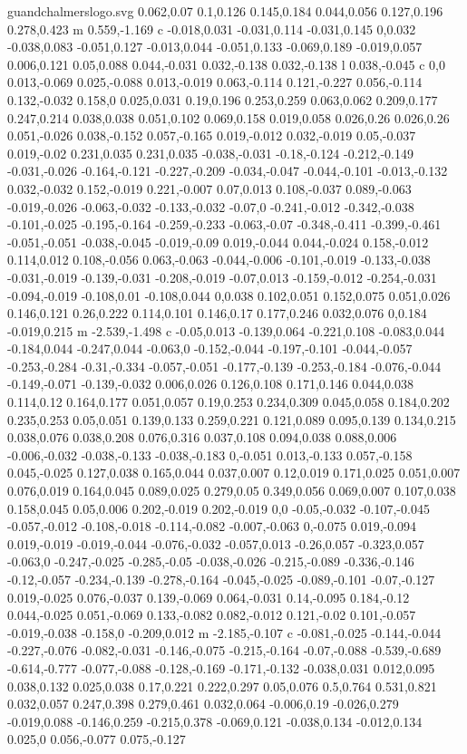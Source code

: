 \begin{filecontents}[noheader]{guandchalmerslogo.svg}
0.062,0.07 0.1,0.126 0.145,0.184 0.044,0.056 0.127,0.196 0.278,0.423 m 0.559,-1.169 c -0.018,0.031 -0.031,0.114 -0.031,0.145 0,0.032 -0.038,0.083 -0.051,0.127 -0.013,0.044 -0.051,0.133 -0.069,0.189 -0.019,0.057 0.006,0.121 0.05,0.088 0.044,-0.031 0.032,-0.138 0.032,-0.138 l 0.038,-0.045 c 0,0 0.013,-0.069 0.025,-0.088 0.013,-0.019 0.063,-0.114 0.121,-0.227 0.056,-0.114 0.132,-0.032 0.158,0 0.025,0.031 0.19,0.196 0.253,0.259 0.063,0.062 0.209,0.177 0.247,0.214 0.038,0.038 0.051,0.102 0.069,0.158 0.019,0.058 0.026,0.26 0.026,0.26 0.051,-0.026 0.038,-0.152 0.057,-0.165 0.019,-0.012 0.032,-0.019 0.05,-0.037 0.019,-0.02 0.231,0.035 0.231,0.035 -0.038,-0.031 -0.18,-0.124 -0.212,-0.149 -0.031,-0.026 -0.164,-0.121 -0.227,-0.209 -0.034,-0.047 -0.044,-0.101 -0.013,-0.132 0.032,-0.032 0.152,-0.019 0.221,-0.007 0.07,0.013 0.108,-0.037 0.089,-0.063 -0.019,-0.026 -0.063,-0.032 -0.133,-0.032 -0.07,0 -0.241,-0.012 -0.342,-0.038 -0.101,-0.025 -0.195,-0.164 -0.259,-0.233 -0.063,-0.07 -0.348,-0.411 -0.399,-0.461 -0.051,-0.051 -0.038,-0.045 -0.019,-0.09 0.019,-0.044 0.044,-0.024 0.158,-0.012 0.114,0.012 0.108,-0.056 0.063,-0.063 -0.044,-0.006 -0.101,-0.019 -0.133,-0.038 -0.031,-0.019 -0.139,-0.031 -0.208,-0.019 -0.07,0.013 -0.159,-0.012 -0.254,-0.031 -0.094,-0.019 -0.108,0.01 -0.108,0.044 0,0.038 0.102,0.051 0.152,0.075 0.051,0.026 0.146,0.121 0.26,0.222 0.114,0.101 0.146,0.17 0.177,0.246 0.032,0.076 0,0.184 -0.019,0.215 m -2.539,-1.498 c -0.05,0.013 -0.139,0.064 -0.221,0.108 -0.083,0.044 -0.184,0.044 -0.247,0.044 -0.063,0 -0.152,-0.044 -0.197,-0.101 -0.044,-0.057 -0.253,-0.284 -0.31,-0.334 -0.057,-0.051 -0.177,-0.139 -0.253,-0.184 -0.076,-0.044 -0.149,-0.071 -0.139,-0.032 0.006,0.026 0.126,0.108 0.171,0.146 0.044,0.038 0.114,0.12 0.164,0.177 0.051,0.057 0.19,0.253 0.234,0.309 0.045,0.058 0.184,0.202 0.235,0.253 0.05,0.051 0.139,0.133 0.259,0.221 0.121,0.089 0.095,0.139 0.134,0.215 0.038,0.076 0.038,0.208 0.076,0.316 0.037,0.108 0.094,0.038 0.088,0.006 -0.006,-0.032 -0.038,-0.133 -0.038,-0.183 0,-0.051 0.013,-0.133 0.057,-0.158 0.045,-0.025 0.127,0.038 0.165,0.044 0.037,0.007 0.12,0.019 0.171,0.025 0.051,0.007 0.076,0.019 0.164,0.045 0.089,0.025 0.279,0.05 0.349,0.056 0.069,0.007 0.107,0.038 0.158,0.045 0.05,0.006 0.202,-0.019 0.202,-0.019 0,0 -0.05,-0.032 -0.107,-0.045 -0.057,-0.012 -0.108,-0.018 -0.114,-0.082 -0.007,-0.063 0,-0.075 0.019,-0.094 0.019,-0.019 -0.019,-0.044 -0.076,-0.032 -0.057,0.013 -0.26,0.057 -0.323,0.057 -0.063,0 -0.247,-0.025 -0.285,-0.05 -0.038,-0.026 -0.215,-0.089 -0.336,-0.146 -0.12,-0.057 -0.234,-0.139 -0.278,-0.164 -0.045,-0.025 -0.089,-0.101 -0.07,-0.127 0.019,-0.025 0.076,-0.037 0.139,-0.069 0.064,-0.031 0.14,-0.095 0.184,-0.12 0.044,-0.025 0.051,-0.069 0.133,-0.082 0.082,-0.012 0.121,-0.02 0.101,-0.057 -0.019,-0.038 -0.158,0 -0.209,0.012 m -2.185,-0.107 c -0.081,-0.025 -0.144,-0.044 -0.227,-0.076 -0.082,-0.031 -0.146,-0.075 -0.215,-0.164 -0.07,-0.088 -0.539,-0.689 -0.614,-0.777 -0.077,-0.088 -0.128,-0.169 -0.171,-0.132 -0.038,0.031 0.012,0.095 0.038,0.132 0.025,0.038 0.17,0.221 0.222,0.297 0.05,0.076 0.5,0.764 0.531,0.821 0.032,0.057 0.247,0.398 0.279,0.461 0.032,0.064 -0.006,0.19 -0.026,0.279 -0.019,0.088 -0.146,0.259 -0.215,0.378 -0.069,0.121 -0.038,0.134 -0.012,0.134 0.025,0 0.056,-0.077 0.075,-0.127 
\end{filecontents}

